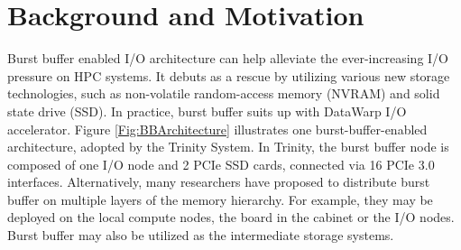 \section{Background and Motivation}
\label{Sec:Background}


Burst buffer enabled I/O architecture can help alleviate
the ever-increasing I/O pressure on HPC systems.
It debuts as a rescue by utilizing various new storage technologies,
such as non-volatile random-access memory (NVRAM) and solid state drive (SSD).
In practice, burst buffer suits up with DataWarp I/O accelerator\cite{DataWarp}.
Figure \ref{Fig:BBArchitecture} illustrates one burst-buffer-enabled architecture,
adopted by the Trinity System\cite{TrinitySystem}.
In Trinity, the burst buffer node is composed of one I/O node and 2 PCIe SSD cards,
connected via 16 PCIe 3.0 interfaces.
Alternatively, many researchers have proposed to distribute burst buffer 
on multiple layers of the memory hierarchy\cite{Romanus:CORR:15}.
For example, they may be deployed on the local compute nodes, the board in the cabinet or the I/O nodes.
Burst buffer may also be utilized as the intermediate storage systems.

